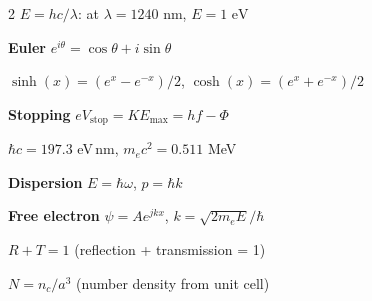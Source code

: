 \documentclass[9pt]{extarticle}
\newcommand{\eqlabel}[1]{\textbf{\scriptsize #1}\;}
\begin{document}
\begin{multicols}{2}
$E = hc/\lambda$: at $\lambda = 1240\text{ nm}$, $E = 1\text{ eV}$

\eqlabel{Euler} $e^{i\theta} = \cos\theta + i\sin\theta$

$\sinh(x) = (e^x - e^{-x})/2$, \; $\cosh(x) = (e^x + e^{-x})/2$

\eqlabel{Stopping} $eV_{\text{stop}} = KE_{\max} = hf - \Phi$

$\hbar c = 197.3$ eV\,nm, \; $m_ec^2 = 0.511$ MeV

\eqlabel{Dispersion} $E = \hbar\omega$, $p = \hbar k$

\eqlabel{Free electron} $\psi = Ae^{jkx}$, $k = \sqrt{2m_eE}/\hbar$

$R + T = 1$ (reflection + transmission = 1)

$N = n_c/a^3$ (number density from unit cell)

\end{multicols}
\end{document}
